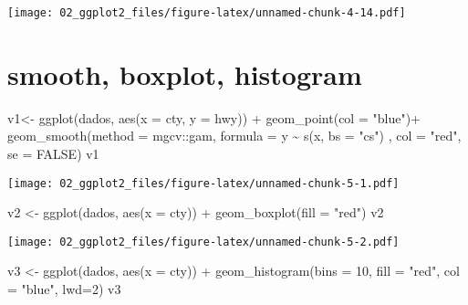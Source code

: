 \documentclass[
]{book}
\newenvironment{Shaded}{\begin{snugshade}}{\end{snugshade}}
\newcommand{\AttributeTok}[1]{\textcolor[rgb]{0.77,0.63,0.00}{#1}}
\newcommand{\ConstantTok}[1]{\textcolor[rgb]{0.00,0.00,0.00}{#1}}
\newcommand{\DecValTok}[1]{\textcolor[rgb]{0.00,0.00,0.81}{#1}}
\newcommand{\FunctionTok}[1]{\textcolor[rgb]{0.00,0.00,0.00}{#1}}
\newcommand{\NormalTok}[1]{#1}
\newcommand{\OtherTok}[1]{\textcolor[rgb]{0.56,0.35,0.01}{#1}}
\newcommand{\SpecialCharTok}[1]{\textcolor[rgb]{0.00,0.00,0.00}{#1}}
\newcommand{\StringTok}[1]{\textcolor[rgb]{0.31,0.60,0.02}{#1}}
\begin{document}
\texttt{[image: 02\_ggplot2\_files/figure-latex/unnamed-chunk-4-14.pdf]}

\hypertarget{smooth-boxplot-histogram}{%
\section{smooth, boxplot, histogram}\label{smooth-boxplot-histogram}}

\begin{Shaded}
\begin{Highlighting}[]
\NormalTok{v1}\OtherTok{\textless{}{-}} \FunctionTok{ggplot}\NormalTok{(dados, }\FunctionTok{aes}\NormalTok{(}\AttributeTok{x =}\NormalTok{ cty, }\AttributeTok{y =}\NormalTok{ hwy)) }\SpecialCharTok{+} 
  \FunctionTok{geom\_point}\NormalTok{(}\AttributeTok{col =} \StringTok{"blue"}\NormalTok{)}\SpecialCharTok{+}
  \FunctionTok{geom\_smooth}\NormalTok{(}\AttributeTok{method =}\NormalTok{ mgcv}\SpecialCharTok{::}\NormalTok{gam,}
              \AttributeTok{formula =}\NormalTok{ y }\SpecialCharTok{\textasciitilde{}} \FunctionTok{s}\NormalTok{(x, }\AttributeTok{bs =} \StringTok{"cs"}\NormalTok{) ,}
              \AttributeTok{col =} \StringTok{"red"}\NormalTok{, }
              \AttributeTok{se =} \ConstantTok{FALSE}\NormalTok{)}
\NormalTok{v1}
\end{Highlighting}
\end{Shaded}

\texttt{[image: 02\_ggplot2\_files/figure-latex/unnamed-chunk-5-1.pdf]}

\begin{Shaded}
\begin{Highlighting}[]
\NormalTok{v2 }\OtherTok{\textless{}{-}} \FunctionTok{ggplot}\NormalTok{(dados, }\FunctionTok{aes}\NormalTok{(}\AttributeTok{x =}\NormalTok{ cty)) }\SpecialCharTok{+} 
  \FunctionTok{geom\_boxplot}\NormalTok{(}\AttributeTok{fill =} \StringTok{"red"}\NormalTok{)}
\NormalTok{v2}
\end{Highlighting}
\end{Shaded}

\texttt{[image: 02\_ggplot2\_files/figure-latex/unnamed-chunk-5-2.pdf]}

\begin{Shaded}
\begin{Highlighting}[]
\NormalTok{v3 }\OtherTok{\textless{}{-}} \FunctionTok{ggplot}\NormalTok{(dados, }\FunctionTok{aes}\NormalTok{(}\AttributeTok{x =}\NormalTok{ cty)) }\SpecialCharTok{+} 
  \FunctionTok{geom\_histogram}\NormalTok{(}\AttributeTok{bins =} \DecValTok{10}\NormalTok{, }\AttributeTok{fill =} \StringTok{"red"}\NormalTok{, }\AttributeTok{col =} \StringTok{"blue"}\NormalTok{, }\AttributeTok{lwd=}\DecValTok{2}\NormalTok{)}
\NormalTok{v3}
\end{Highlighting}
\end{Shaded}
\end{document}

